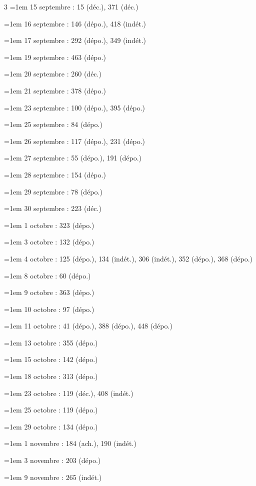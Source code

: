 \begin{multicols}{3}
\hangindent=1em 15 septembre : 15 (déc.), 371 (déc.)\par
\hangindent=1em 16 septembre : 146 (dépo.), 418 (indét.)\par
\hangindent=1em 17 septembre : 292 (dépo.), 349 (indét.)\par
\hangindent=1em 19 septembre : 463 (dépo.)\par
\hangindent=1em 20 septembre : 260 (déc.)\par
\hangindent=1em 21 septembre : 378 (dépo.)\par
\hangindent=1em 23 septembre : 100 (dépo.), 395 (dépo.)\par
\hangindent=1em 25 septembre : 84 (dépo.)\par
\hangindent=1em 26 septembre : 117 (dépo.), 231 (dépo.)\par
\hangindent=1em 27 septembre : 55 (dépo.), 191 (dépo.)\par
\hangindent=1em 28 septembre : 154 (dépo.)\par
\hangindent=1em 29 septembre : 78 (dépo.)\par
\hangindent=1em 30 septembre : 223 (déc.)\par
\hangindent=1em 1 octobre : 323 (dépo.)\par
\hangindent=1em 3 octobre : 132 (dépo.)\par
\hangindent=1em 4 octobre : 125 (dépo.), 134 (indét.), 306 (indét.), 352 (dépo.), 368 (dépo.)\par
\hangindent=1em 8 octobre : 60 (dépo.)\par
\hangindent=1em 9 octobre : 363 (dépo.)\par
\hangindent=1em 10 octobre : 97 (dépo.)\par
\hangindent=1em 11 octobre : 41 (dépo.), 388 (dépo.), 448 (dépo.)\par
\hangindent=1em 13 octobre : 355 (dépo.)\par
\hangindent=1em 15 octobre : 142 (dépo.)\par
\hangindent=1em 18 octobre : 313 (dépo.)\par
\hangindent=1em 23 octobre : 119 (déc.), 408 (indét.)\par
\hangindent=1em 25 octobre : 119 (dépo.)\par
\hangindent=1em 29 octobre : 134 (dépo.)\par
\hangindent=1em 1 novembre : 184 (ach.), 190 (indét.)\par
\hangindent=1em 3 novembre : 203 (dépo.)\par
\hangindent=1em 9 novembre : 265 (indét.)\par

\end{multicols}
